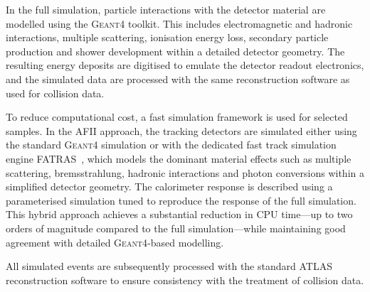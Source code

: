 In the full simulation, particle interactions with the detector material are modelled using the \textsc{Geant4} toolkit. 
This includes electromagnetic and hadronic interactions, multiple scattering, ionisation energy loss, secondary particle production and shower development within a detailed detector geometry. 
The resulting energy deposits are digitised to emulate the detector readout electronics, and the simulated data are processed with the same reconstruction software as used for collision data.

To reduce computational cost, a fast simulation framework is used for selected samples. 
In the AFII approach, the tracking detectors are simulated either using the standard \textsc{Geant4} simulation or with the dedicated fast track simulation engine FATRAS~\cite{ATLAS2011FATRAS}, which models the dominant material effects such as multiple scattering, bremsstrahlung, hadronic interactions and photon conversions within a simplified detector geometry. 
The calorimeter response is described using a parameterised simulation tuned to reproduce the response of the full simulation. 
This hybrid approach achieves a substantial reduction in CPU time—up to two orders of magnitude compared to the full simulation—while maintaining good agreement with detailed \textsc{Geant4}-based modelling.

All simulated events are subsequently processed with the standard ATLAS reconstruction software to ensure consistency with the treatment of collision data.